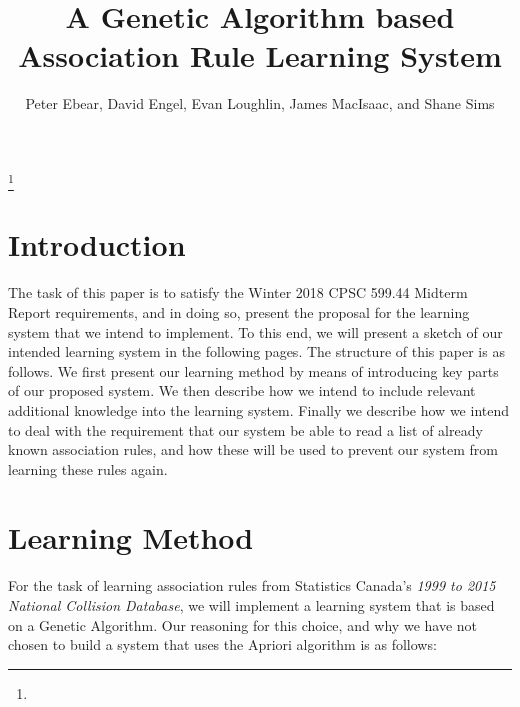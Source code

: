 \documentclass{amsart}
\theoremstyle{definition}
\theoremstyle{remark}
\numberwithin{equation}{section}
\begin{document}
\title{A Genetic Algorithm based Association Rule Learning System}


\author{Peter Ebear, David Engel, Evan Loughlin, James MacIsaac, and Shane Sims }
\address{}
\curraddr{}
\thanks{}




\keywords{}

\date{}

\dedicatory{}

\maketitle

\section{Introduction}
The task of this paper is to satisfy the Winter 2018 CPSC 599.44 Midterm Report requirements, and in doing so, present the proposal for the learning system that we intend to implement. To this end, we will present a sketch of our intended learning system in the following pages. The structure of this paper is as follows. We first present our learning method by means of introducing key parts of our proposed system. We then describe how we intend to include relevant additional knowledge into the learning system. Finally we describe how we intend to deal with the requirement that our system be able to read a list of already known association rules, and how these will be used to prevent our system from learning these rules again.

\section{Learning Method}

For the task of learning association rules from Statistics Canada's \textit{1999 to 2015 National Collision Database}, we will implement a learning system that is based on a Genetic Algorithm. Our reasoning for this choice, and why we have not chosen to build a system that uses the Apriori algorithm is as follows:\newline
\end{document}

